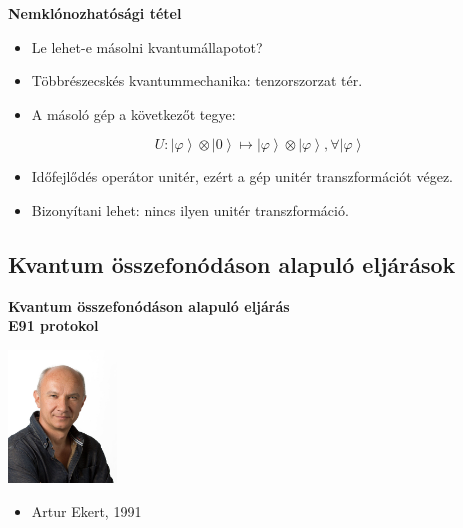 \documentclass{beamer}
\begin{document}
    \begin{frame}

        \center

        \textbf{Nemklónozhatósági tétel}

        \begin{itemize}
            \item Le lehet-e másolni kvantumállapotot?
            \item Többrészecskés kvantummechanika: tenzorszorzat tér.
            \item A másoló gép a következőt tegye:
        \end{itemize}

        \begin{equation}
            U: \left| \varphi \right\rangle \otimes \left| 0 \right\rangle
            \mapsto \left| \varphi \right\rangle \otimes \left| \varphi \right\rangle, \forall \left| \varphi \right\rangle
        \end{equation}

        \begin{itemize}
            \item Időfejlődés operátor unitér, ezért a gép unitér transzformációt végez.
            \item Bizonyítani lehet: nincs ilyen unitér transzformáció.
        \end{itemize}

    \end{frame}

    \subsection{Kvantum összefonódáson alapuló eljárások}

    \begin{frame}

        \center

        \textbf{Kvantum összefonódáson alapuló eljárás\\E91 protokol}

        \includegraphics[height=100pt]{ekert.jpg}

        \begin{itemize}
            \item Artur Ekert, 1991
        \end{itemize}

    \end{frame}
\end{document}
